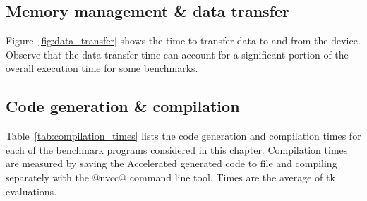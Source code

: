 \subsection{Memory management \& data transfer}

Figure~\ref{fig:data_transfer} shows the time to transfer data to and from the
device. Observe that the data transfer time can account for a significant
portion of the overall execution time for some benchmarks.


\subsection{Code generation \& compilation}

Table~\ref{tab:compilation_times} lists the code generation and compilation
times for each of the benchmark programs considered in this chapter. Compilation
times are measured by saving the Accelerated generated code to file and
compiling separately with the @nvcc@ command line tool. Times are the average of
tk evaluations.

